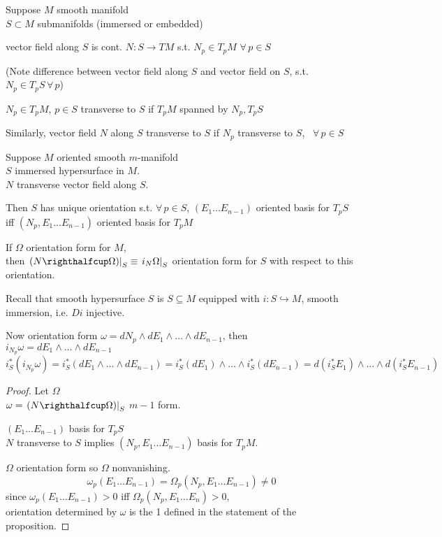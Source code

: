 Suppose $M$ smooth manifold \\
\phantom{Suppose} $S\subset M$ submanifolds (immersed or embedded)

vector field along $S$ is cont. $N: S \to TM$ s.t. $N_p \in T_pM$ \quad $\forall \, p \in S$

(Note difference between vector field along $S$ and vector field on $S$, s.t. $N_p \in T_pS \, \forall \, p$)

$N_p \in T_pM$, $p\in S$ transverse to $S$ if $T_pM$ spanned by $N_p, T_pS$

Similarly, vector field $N$ along $S$ transverse to $S$ if $N_p$ transverse to $S$, \, $\forall \, p \in S$




\begin{proposition} Suppose $M$ oriented smooth $m$-manifold \\
\phantom{Proposition 13.12 Suppose  } $S$ immersed hypersurface in $M$.  \\
\phantom{Proposition 13.12 Suppose  } $N$ transverse vector field along $S$.  

Then $S$ has unique orientation s.t. $\forall \, p \in S$, $(E_1 \dots E_{n-1})$ oriented basis for $T_pS$ iff $(N_p, E_1 \dots E_{n-1})$ oriented basis for $T_pM$

If $\Omega$ orientation form for $M$, \\
then $\left. (N \righthalfcup \Omega) \right|_S \equiv \left. i_N\Omega \right|_S $ orientation form for $S$ with respect to this orientation.  
\end{proposition}

Recall that smooth hypersurface $S$ is $S\subseteq M$ equipped with $i: S \hookrightarrow M$, smooth immersion, i.e. $Di$ injective.  

Now orientation form $\omega = dN_p \wedge dE_1 \wedge \dots \wedge dE_{n-1}$, then \\
$i_{N_p} \omega  =dE_1 \wedge \dots \wedge dE_{n-1}$
\[
i^*_S (i_{N_p}\omega) = i^*_S (dE_1 \wedge \dots \wedge dE_{n-1}) = i^*_S(dE_1) \wedge \dots \wedge i^*_S(dE_{n-1}) = d(i^*_SE_1) \wedge \dots \wedge d(i_S^*E_{n-1})
\]



\begin{proof} Let $\Omega$ \\
\phantom{proof Let } $\omega  = \left. (N \righthalfcup \Omega) \right|_S$ $m-1$ form.  

$(E_1 \dots E_{n-1}) $ basis for $T_pS$ \\
$N$ transverse to $S$ implies $(N_p, E_1 \dots E_{n-1})$ basis for $T_pM$.  

$\Omega$ orientation form so $\Omega$ nonvanishing.  
\[
\omega_p(E_1 \dots E_{n-1}) = \Omega_p(N_p, E_1 \dots E_{n-1}) \neq 0
\]
since $\omega_p(E_1 \dots E_{n-1}) >0$ iff $\Omega_p(N_p, E_1 \dots E_n) >0$,  \\
orientation determined by $\omega$ is the 1 defined in the statement of the proposition.  

\end{proof}
